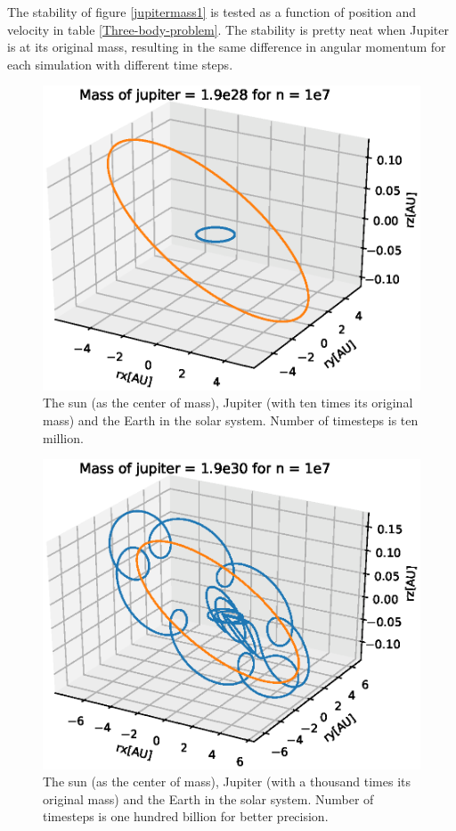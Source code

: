 \documentclass{article}
\begin{document}
The stability of figure \ref{jupitermass1} is tested as a function of position and velocity in table \ref{Three-body-problem}. The stability is pretty neat when Jupiter is at its original mass, resulting in the same difference in angular momentum for each simulation with different time steps.


\begin{figure}[H]
  \includegraphics[scale=0.5]{plots/Mass10.eps}
  \caption{The sun (as the center of mass), Jupiter (with ten times its original mass) and the Earth in the solar system. Number of timesteps is ten million.}
  \label{jupitermass10}
\end{figure}

\begin{figure}[H]
  \includegraphics[scale=0.6]{plots/Mass1000.eps}
  \caption{The sun (as the center of mass), Jupiter (with a thousand times its original mass) and the Earth in the solar system. Number of timesteps is one hundred billion for better precision.}
  \label{jupitermass1000}
\end{figure}
\end{document}

